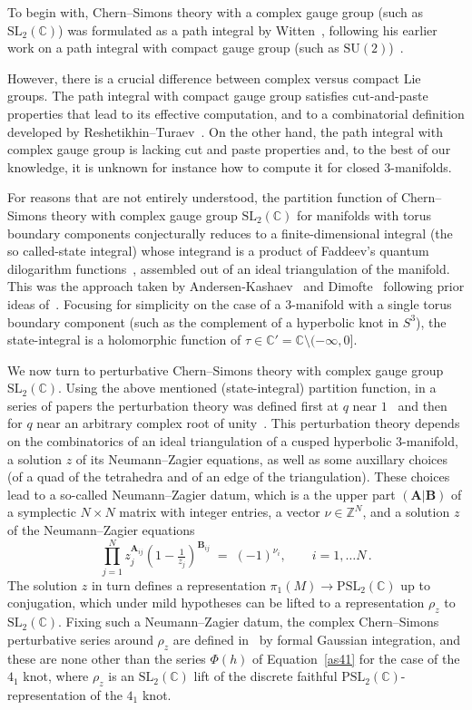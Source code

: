 \documentclass[12pt,reqno]{amsart}
\theoremstyle{definition}
\def\BZ{\mathbb Z}
\def\BC{\mathbb C}
\def\SL{\mathrm{SL}}
\def\PSL{\mathrm{PSL}}
\def\be{\begin{equation}}
\def\ee{\end{equation}}
\def\={\;=\;}
\begin{document}
To begin with, Chern--Simons theory
with a complex gauge group (such as $\SL_2(\BC)$) was formulated as a path integral
by Witten~\cite{Witten:complexCS}, following his earlier work on a path integral
with compact gauge group (such as $\mathrm{SU}(2)$)~\cite{Witten:jones}.

However,
there is a crucial difference between complex versus compact Lie groups. The path
integral with compact gauge group satisfies cut-and-paste properties that lead to
its effective computation, and to a combinatorial definition developed by
Reshetikhin--Turaev~\cite{RT:ribbon,Tu:book}.
On the other hand, the path integral with complex
gauge group is lacking cut and paste properties and, to the best of our knowledge,
it is unknown for instance how to compute it for closed 3-manifolds. 

For reasons that are not entirely understood, the partition function of 
Chern--Simons theory with complex gauge group $\SL_2(\BC)$ for manifolds with torus
boundary components conjecturally reduces to a finite-dimensional integral (the so called-state
integral) whose integrand is a product of Faddeev's quantum dilogarithm
functions~\cite{Faddeev}, assembled out of an ideal triangulation of
the manifold. This was the approach taken by
Andersen-Kashaev~\cite{AK, AK-review} and Dimofte~\cite{dimofte-rev}
following prior ideas of~\cite{Hikami,DGLZ}. Focusing for simplicity
on the case of a 3-manifold with a single torus boundary component
(such as the complement of a hyperbolic knot in $S^3$), the
state-integral is a holomorphic function of
$\tau \in \BC'=\BC\setminus (-\infty,0]$.

We now turn to perturbative Chern--Simons theory with complex gauge group
$\SL_2(\BC)$. Using the above mentioned (state-integral) partition function, in
a series of papers the perturbation theory was defined first at $q$ near
$1$~\cite{DG} and then for $q$ near an arbitrary complex root of unity~\cite{DG2}.
This perturbation theory depends on the combinatorics of an ideal triangulation
of a cusped hyperbolic 3-manifold, a solution $z$ of its Neumann--Zagier equations,
as well as some auxillary choices (of a quad of the tetrahedra and of an edge of the
triangulation). These choices lead to a so-called Neumann--Zagier datum, which
is a the upper part $(\boldsymbol{A}|\boldsymbol{B})$ of a symplectic $N \times N$
matrix with integer entries, a vector $\nu \in \BZ^N$, and a solution $z$ of the
Neumann--Zagier equations
\be
\label{NZeqn}
\prod_{j=1}^N z_j^{\boldsymbol{A}_{ij}} (1-\tfrac{1}{z_j})^{\boldsymbol{B}_{ij}}
\= (-1)^{\nu_i}, \qquad i=1,\dots N\,.
\ee
The solution $z$ in turn defines a representation $\pi_1(M) \to \PSL_2(\BC)$ up to
conjugation, which under mild hypotheses can be lifted to a representation $\rho_z$
to $\SL_2(\BC)$. 
Fixing such a Neumann--Zagier datum, the complex Chern--Simons perturbative series
around $\rho_z$ are defined in~\cite{DG,DG2} by formal Gaussian integration, 
and these are none other than the series $\Phi(h)$ of Equation~\eqref{as41} for
the case of the $4_1$ knot, where $\rho_z$ is an $\SL_2(\BC)$ lift of the discrete
faithful $\PSL_2(\BC)$-representation of the $4_1$ knot. 
\end{document}
